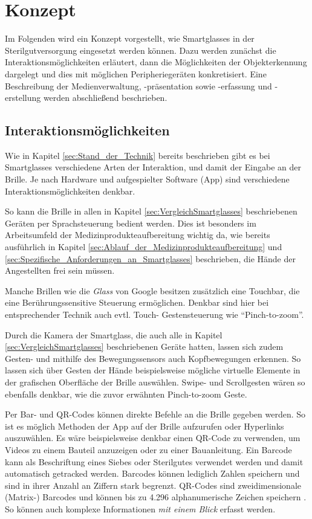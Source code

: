 %
%
%
%
%
%
\chapter{Konzept}
\label{ch:Konzept}
Im Folgenden wird ein Konzept vorgestellt, wie Smartglasses in der Sterilgutversorgung eingesetzt werden können. Dazu werden zunächst die Interaktionsmöglichkeiten erläutert, dann die Möglichkeiten der Objekterkennung dargelegt und dies mit möglichen Peripheriegeräten konkretisiert. Eine Beschreibung der Medienverwaltung, -präsentation sowie -erfassung und -erstellung werden abschließend beschrieben.
%
%
%
%
%
%
\section{Interaktionsmöglichkeiten}
\label{sec:Interaktionsmoeglichkeiten}
Wie in Kapitel \ref{sec:Stand_der_Technik} bereits beschrieben gibt es bei Smartglasses verschiedene Arten der Interaktion, und damit der Eingabe an der Brille. Je nach Hardware und aufgespielter Software (App) sind verschiedene Interaktionsmöglichkeiten denkbar. 

So kann die Brille in allen in Kapitel \ref{sec:VergleichSmartglasses} beschriebenen Geräten per Sprachsteuerung bedient werden. Dies ist besonders im Arbeitsumfeld der Medizinprodukteaufbereitung wichtig da, wie bereits ausführlich in Kapitel \ref{sec:Ablauf_der_Medizinprodukteaufbereitung} und \ref{sec:Spezifische_Anforderungen_an_Smartglasses} beschrieben, die Hände der Angestellten frei sein müssen.

Manche Brillen wie die \emph{Glass} von Google besitzen zusätzlich eine Touchbar, die eine Berührungssensitive Steuerung ermöglichen. Denkbar sind hier bei entsprechender Technik auch evtl. Touch- Gestensteuerung wie \enquote{Pinch-to-zoom}.

Durch die Kamera der Smartglass, die auch alle in Kapitel \ref{sec:VergleichSmartglasses} beschriebenen Geräte hatten, lassen sich zudem Gesten- und mithilfe des Bewegungssensors auch Kopfbewegungen erkennen. So lassen sich über Gesten der Hände beispielsweise mögliche virtuelle Elemente in der grafischen Oberfläche der Brille auswählen. Swipe- und Scrollgesten wären so ebenfalls denkbar, wie die zuvor erwähnten Pinch-to-zoom Geste.

Per Bar- und QR-Codes können direkte Befehle an die Brille gegeben werden. So ist es möglich Methoden der App auf der Brille aufzurufen oder Hyperlinks auszuwählen. Es wäre beispielsweise denkbar einen QR-Code zu verwenden, um Videos zu einem Bauteil anzuzeigen oder zu einer Bauanleitung. Ein Barcode kann als Beschriftung eines Siebes oder Sterilgutes verwendet werden und damit automatisch getracked werden. Barcodes können lediglich Zahlen speichern und sind in ihrer Anzahl an Ziffern stark begrenzt. QR-Codes sind zweidimensionale (Matrix-) Barcodes  und können bis zu 4.296 alphanumerische Zeichen speichern \cite{INCORPORATED2018}. So können auch komplexe Informationen \emph{mit einem Blick} erfasst werden.

